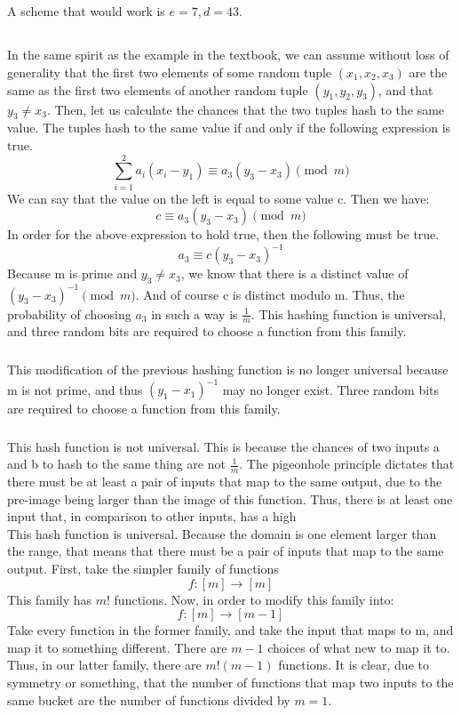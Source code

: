 \documentclass{article}
\begin{document}
\subsection{}
A scheme that would work is $e=7, d=43$. 
\subsection{}
\subsubsection{}
In the same spirit as the example in the textbook, we can assume without loss of generality that the first two elements of some random tuple $(x_1, x_2, x_3)$ are the same as the first two elements of another random tuple $(y_1, y_2, y_3)$, and that $y_3 \neq x_3$. Then, let us calculate the chances that the two tuples hash to the same value. The tuples hash to the same value if and only if the following expression is true. 
$$\sum_{i=1}^2a_i(x_i-y_1) \equiv a_3(y_3-x_3) \pmod m$$
We can say that the value on the left is equal to some value c. Then we have:
$$c \equiv a_3(y_3-x_3) \pmod m$$
In order for the above expression to hold true, then the following must be true. 
$$a_3 \equiv c(y_3-x_3)^{-1}$$
Because m is prime and $y_3 \neq x_3$, we know that there is a distinct value of $(y_3-x_3)^{-1} \pmod m$. And of course c is distinct modulo m. Thus, the probability of choosing $a_3$ in such a way is $\frac{1}{m}$. This hashing function is universal, and three random bits are required to choose a function from this family. 
\subsubsection{}
This modification of the previous hashing function is no longer universal because m is not prime, and thus $(y_1-x_1)^{-1}$ may no longer exist. Three random bits are required to choose a function from this family.  
\subsubsection{}
This hash function is not universal. This is because the chances of two inputs a and b to hash to the same thing are not $\frac{1}{m}$. The pigeonhole principle dictates that there must be at least a pair of inputs that map to the same output, due to the pre-image being larger than the image of this function. Thus, there is at least one input that, in comparison to other inputs, has a high
\\
This hash function is universal. Because the domain is one element larger than the range, that means that there must be a pair of inputs that map to the same output. First, take the simpler family of functions 
$$f: [m] \rightarrow [m]$$
This family has $m!$ functions. Now, in order to modify this family into:
$$f: [m] \rightarrow [m-1]$$
Take every function in the former family, and take the input that maps to m, and map it to something different. There are $m-1$ choices of what new to map it to. Thus, in our latter family, there are $m!(m-1)$ functions. It is clear, due to symmetry or something, that the number of functions that map two inputs to the same bucket are the number of functions divided by $m=1$.
\end{document}
